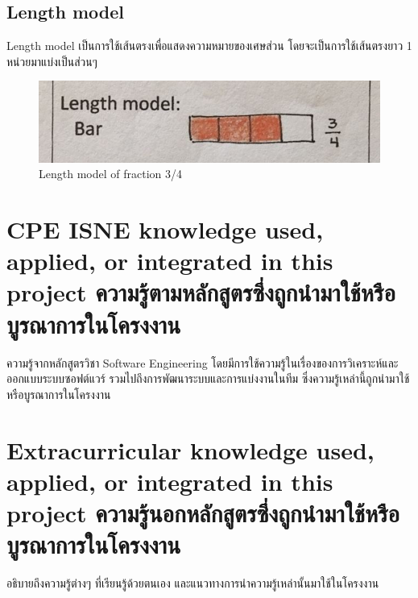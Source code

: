 \subsection{Length model}
Length model เป็นการใช้เส้นตรงเพื่อแสดงความหมายของเศษส่วน โดยจะเป็นการใช้เส้นตรงยาว 1 หน่วยมาแบ่งเป็นส่วนๆ
\begin{figure}[h!tbp]
\begin{center}
\includegraphics{Length_model.png}
\end{center}
\caption[Poem]{Length model of fraction 3/4}
\end{figure}




\section{\ifenglish%
\ifcpe CPE \else ISNE \fi knowledge used, applied, or integrated in this project
\else%
ความรู้ตามหลักสูตรซึ่งถูกนำมาใช้หรือบูรณาการในโครงงาน
\fi
}

ความรู้จากหลักสูตรวิชา Software Engineering โดยมีการใช้ความรู้ในเรื่องของการวิเคราะห์และออกแบบระบบซอฟต์แวร์ รวมไปถึงการพัฒนาระบบและการแบ่งงานในทีม ซึ่งความรู้เหล่านี้ถูกนำมาใช้หรือบูรณาการในโครงงาน

\section{\ifenglish%
Extracurricular knowledge used, applied, or integrated in this project
\else%
ความรู้นอกหลักสูตรซึ่งถูกนำมาใช้หรือบูรณาการในโครงงาน
\fi
}

อธิบายถึงความรู้ต่างๆ ที่เรียนรู้ด้วยตนเอง และแนวทางการนำความรู้เหล่านั้นมาใช้ในโครงงาน
